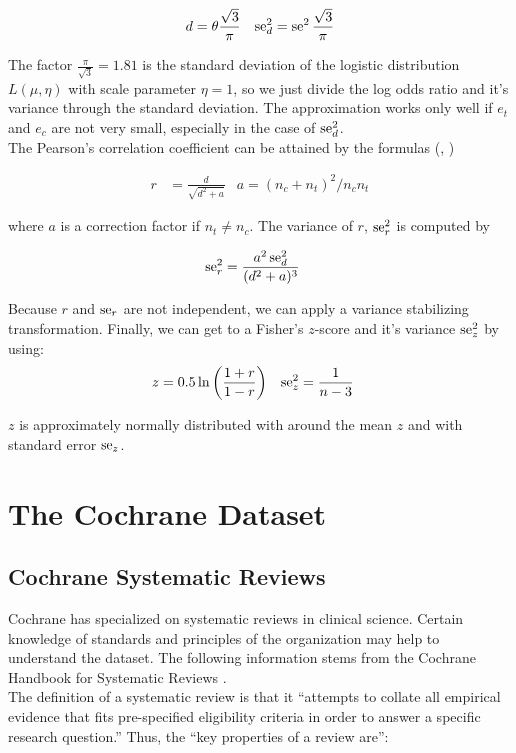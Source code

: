 \documentclass[11pt,a4paper,twoside]{book}\usepackage[]{graphicx}\usepackage[]{color}
\begin{document}
\begin{align}
d &= \theta \frac{\sqrt{3}}{\pi} & \operatorname{se}_d^2 =  \operatorname{se}^2\frac{\sqrt{3}}{\pi} \nonumber
\end{align}

The factor $\frac{\pi}{\sqrt{3}} = 1.81$ is the standard deviation of the logistic distribution $L(\mu, \eta)$ with scale parameter $\eta = 1$, so we just divide the log odds ratio and it's variance through the standard deviation. The approximation works only well if $e_t$ and $e_c$ are not very small, especially in the case of $\operatorname{se}_d^2$. \\
The Pearson's correlation coefficient can be attained by the formulas (\citealp{olkin1985dtor}, \cite[48]{Intro.meta})

\begin{align}
r &= \frac{d}{\sqrt{d^2 + a}} & a = (n_c + n_t)^2 / n_c n_t \nonumber
\end{align}

where $a$ is a correction factor if $n_t \neq n_c$. The variance of $r$, $\operatorname{se}_r^2$ is computed by

\begin{align}
\operatorname{se}_r^2 &= \frac{a^2 \operatorname{se}_d^2}{(d^2 + a)^3} \nonumber
\end{align}

Because $r$ and $\operatorname{se}_r$ are not independent, we can apply a variance stabilizing transformation. Finally, we can get to a Fisher's $z$-score and it's variance $\operatorname{se}_z^2$ by using:
\begin{align}
z &= 0.5 \ln\bigg(\frac{1 + r}{1 - r}\bigg) & \nonumber
\operatorname{se}_z^2 &= \frac{1}{n-3}
\end{align}

$z$ is approximately normally distributed with around the mean $z$ and with standard error $\operatorname{se}_z$.













\chapter{The Cochrane Dataset} \label{ch:dataset}


\section{Cochrane Systematic Reviews}
Cochrane has specialized on systematic reviews in clinical science. Certain knowledge of standards and principles of the organization may help to understand the dataset. The following information stems from the Cochrane Handbook for Systematic Reviews \citep{cochrane.handbook}. \\
The definition of a systematic review is that it ``attempts to collate all empirical evidence that fits pre-specified eligibility criteria in order to answer a specific research question.'' Thus, the ``key properties of a review are'':
\end{document}
